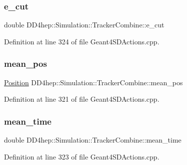 \subsubsection{\texorpdfstring{e\+\_\+cut}{e\_cut}}
{\footnotesize\ttfamily double D\+D4hep\+::\+Simulation\+::\+Tracker\+Combine\+::e\+\_\+cut}



Definition at line 324 of file Geant4\+S\+D\+Actions.\+cpp.

\hypertarget{struct_d_d4hep_1_1_simulation_1_1_tracker_combine_a66a9636b7e0e4712718366da7db0ddf6}{}\label{struct_d_d4hep_1_1_simulation_1_1_tracker_combine_a66a9636b7e0e4712718366da7db0ddf6} 
\subsubsection{\texorpdfstring{mean\+\_\+pos}{mean\_pos}}
{\footnotesize\ttfamily \hyperlink{namespace_d_d4hep_1_1_geometry_a55083902099d03506c6db01b80404900}{Position} D\+D4hep\+::\+Simulation\+::\+Tracker\+Combine\+::mean\+\_\+pos}



Definition at line 321 of file Geant4\+S\+D\+Actions.\+cpp.

\hypertarget{struct_d_d4hep_1_1_simulation_1_1_tracker_combine_a88f539f333235ec8d8746fe11fd70e12}{}\label{struct_d_d4hep_1_1_simulation_1_1_tracker_combine_a88f539f333235ec8d8746fe11fd70e12} 
\subsubsection{\texorpdfstring{mean\+\_\+time}{mean\_time}}
{\footnotesize\ttfamily double D\+D4hep\+::\+Simulation\+::\+Tracker\+Combine\+::mean\+\_\+time}



Definition at line 323 of file Geant4\+S\+D\+Actions.\+cpp.

\hypertarget{struct_d_d4hep_1_1_simulation_1_1_tracker_combine_a04a629d7ed0ac04fd945466a40bb7e48}{}\label{struct_d_d4hep_1_1_simulation_1_1_tracker_combine_a04a629d7ed0ac04fd945466a40bb7e48} 

